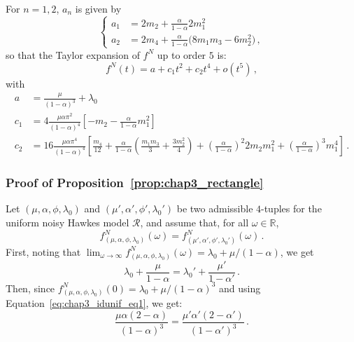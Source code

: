 \begin{subappendices}
\begin{remark}
For $n = 1, 2$, $a_n$ is given by
\[
\begin{cases}
    a_1 &= 2 m_2 + \frac{\alpha}{1 - \alpha} 2 m_1^2 \\
    a_2 &= 2 m_4 + \frac{\alpha}{1 - \alpha} \bigl(8 m_1 m_3 - 6 m_2^2\bigr) \,,
\end{cases}
\]
so that the Taylor expansion of $f^N$ up to order $5$ is:
\begin{equation*}
  f^N(t) = a + c_1 t^2 + c_2 t^4 + o(t^5) \,,
\end{equation*}
with
\begin{align*}
a &= \frac{\mu}{(1-\alpha)^3} + \lambda_0 \\
  c_1 &= 4 \frac{\mu\alpha \pi^2}{(1-\alpha)^4} \left[ - m_2 - \frac{\alpha}{1 - \alpha} m_1^2 \right]\\
  c_2 &= 16 \frac{\mu\alpha \pi^4}{(1-\alpha)^4} \left[ \frac{m_4}{12} + \frac{\alpha}{1 - \alpha} \left( \frac{m_1 m_3}{3} + \frac{3 m_2^2}{4} \right) + \left( \frac{\alpha}{1 - \alpha} \right)^2 2 m_2 m_1^2 + \left( \frac{\alpha}{1 - \alpha} \right)^3 m_1^4 \right] \,.
\end{align*}
\end{remark}

\subsubsection*{Proof of Proposition~\ref{prop:chap3_rectangle}}
Let $(\mu, \alpha, \phi, \lambda_0)$ and $(\mu', \alpha', \phi', \lambda_0')$ be two admissible $4$-tuples for the uniform noisy Hawkes model $\mathcal R$, and assume that, for all $\omega \in \mathbb R$,
\begin{equation*}
  f_{(\mu, \alpha, \phi, \lambda_0)}^N(\omega) = f_{(\mu', \alpha', \phi', \lambda_0')}^N(\omega)\,.
\end{equation*}
First, noting that $\lim_{\omega\to\infty} f_{(\mu, \alpha, \phi, \lambda_0)}^N(\omega) = \lambda_0 + \mu/(1 - \alpha)$, we get
\begin{equation}\label{eq:chap3_idunif_eq1}
  \lambda_0 + \frac{\mu}{1 - \alpha} = \lambda_0' + \frac{\mu'}{1 - \alpha'}\,.
\end{equation}
Then, since $f_{(\mu, \alpha, \phi, \lambda_0)}^N(0) = \lambda_0 + \mu/(1-\alpha)^3$ and using Equation~\eqref{eq:chap3_idunif_eq1}, we get:
\begin{equation}\label{eq:chap3_idunif_eq2}
  \frac{\mu\alpha(2-\alpha)}{(1-\alpha)^3} = \frac{\mu'\alpha'(2-\alpha')}{(1-\alpha')^3}\,.
\end{equation}


\end{subappendices}
